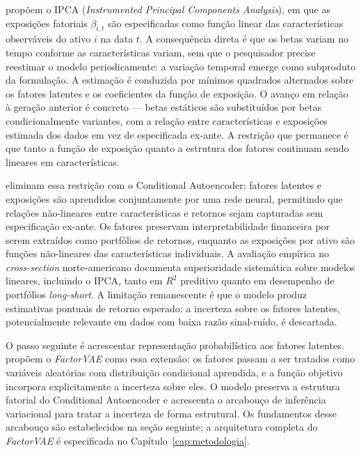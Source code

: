 \textcite{kelly2019} propõem o IPCA (\textit{Instrumented Principal Components Analysis}), em que
as exposições fatoriais $\beta_{i,t}$ são especificadas como função linear das características
observáveis do ativo $i$ na data $t$. A consequência direta é que os betas variam no tempo
conforme as características variam, sem que o pesquisador precise reestimar o modelo
periodicamente: a variação temporal emerge como subproduto da formulação. A estimação é conduzida
por mínimos quadrados alternados sobre os fatores latentes e os coeficientes da função de
exposição. O avanço em relação à geração anterior é concreto --- betas estáticos são substituídos
por betas condicionalmente variantes, com a relação entre características e exposições estimada dos
dados em vez de especificada ex-ante. A restrição que permanece é que tanto a função de exposição
quanto a estrutura dos fatores continuam sendo lineares em características.

\textcite{gu2021} eliminam essa restrição com o Conditional Autoencoder: fatores latentes e
exposições são aprendidos conjuntamente por uma rede neural, permitindo que relações não-lineares
entre características e retornos sejam capturadas sem especificação ex-ante. Os fatores preservam
interpretabilidade financeira por serem extraídos como portfólios de retornos, enquanto as
exposições por ativo são funções não-lineares das características individuais. A avaliação empírica
no \textit{cross-section} norte-americano documenta superioridade sistemática sobre modelos
lineares, incluindo o IPCA, tanto em $R^2$ preditivo quanto em desempenho de portfólios \textit{long-short}. A limitação remanescente é que o modelo produz estimativas pontuais de retorno
esperado: a incerteza sobre os fatores latentes, potencialmente relevante em dados com baixa razão
sinal-ruído, é descartada.

O passo seguinte é acrescentar representação probabilística aos fatores latentes.
\textcite{duan2022} propõem o \textit{FactorVAE} como essa extensão: os fatores passam a ser
tratados como variáveis aleatórias com distribuição condicional aprendida, e a função objetivo
incorpora explicitamente a incerteza sobre eles. O modelo preserva a estrutura fatorial do
Conditional Autoencoder e acrescenta o arcabouço de inferência variacional para tratar a incerteza
de forma estrutural. Os fundamentos desse arcabouço são estabelecidos na seção seguinte; a
arquitetura completa do \textit{FactorVAE} é especificada no Capítulo~\ref{cap:metodologia}.



